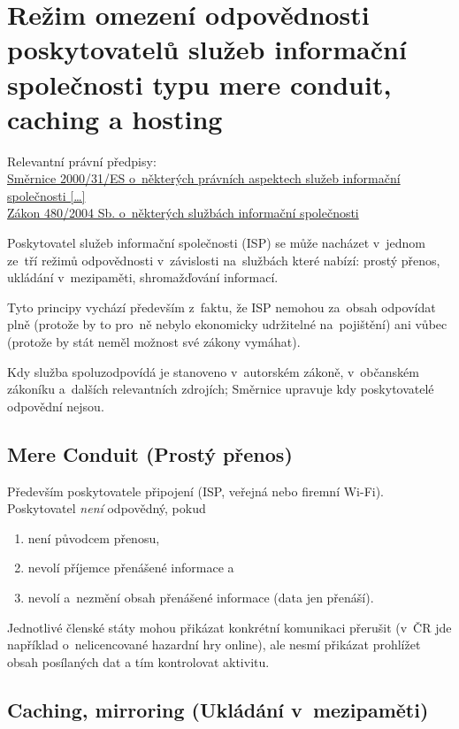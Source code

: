 \section{Režim omezení odpovědnosti poskytovatelů služeb informační společnosti typu mere conduit, caching a hosting}

{}Relevantní právní předpisy:
\\\href{https://eur-lex.europa.eu/legal-content/CS/ALL/?uri=CELEX:32000L0031
}{Směrnice 2000/31/ES o~některých právních aspektech služeb informační společnosti [\dots]}
\\\href{https://www.zakonyprolidi.cz/cs/2004-480}{Zákon 480/2004 Sb. o~některých službách informační společnosti}

Poskytovatel služeb informační společnosti (ISP) se může nacházet v~jednom ze~tří režimů odpovědnosti v~závislosti na~službách které nabízí: prostý přenos, ukládání v~mezipaměti, shromažďování informací.

Tyto principy vychází především z~faktu, že ISP nemohou za~obsah odpovídat plně (protože by to pro~ně nebylo ekonomicky udržitelné na~pojištění) ani vůbec (protože by stát neměl možnost své zákony vymáhat).

Kdy služba spoluzodpovídá je stanoveno v~autorském zákoně, v~občanském zákoníku a~dalších relevantních zdrojích; Směrnice upravuje kdy poskytovatelé odpovědní nejsou.


\subsection{Mere Conduit (Prostý přenos)}

Především poskytovatele připojení (ISP, veřejná nebo firemní Wi-Fi).
Poskytovatel \emph{není} odpovědný, pokud
\begin{enumerate}[label=\alph*)]
\item není původcem přenosu,
\item nevolí příjemce přenášené informace a
\item nevolí a~nezmění obsah přenášené informace (data jen přenáší).
\end{enumerate}

Jednotlivé členské státy mohou přikázat konkrétní komunikaci přerušit (v~ČR jde například o~nelicencované hazardní hry online), ale nesmí přikázat prohlížet obsah posílaných dat a tím kontrolovat aktivitu.

\subsection{Caching, mirroring (Ukládání v~mezipaměti)}

